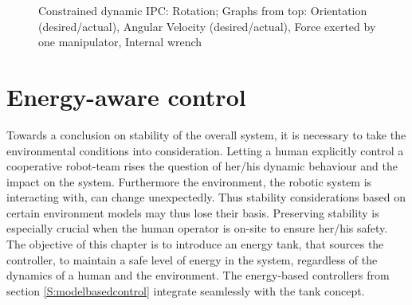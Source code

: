 \documentclass[a4paper,twoside, openright,12pt]{report}
\begin{document}
\begin{figure}[t]
\begin{tikzpicture}
\end{tikzpicture}
\vspace{-10pt}
\caption[IPC: Rotation]{Constrained dynamic IPC: Rotation; Graphs from top: Orientation (desired/actual), Angular Velocity (desired/actual), Force exerted by one manipulator, Internal wrench}
	\label{FIG:DIPCrot}
\end{figure}


\chapter{Energy-aware control}\label{C:Energy-aware control}
Towards a conclusion on stability of the overall system, it is necessary to take the environmental conditions into consideration. Letting a human explicitly control a cooperative robot-team rises the question of her/his dynamic behaviour and the impact on the system. Furthermore the environment, the robotic system is interacting with, can change unexpectedly. Thus stability considerations based on certain environment models may thus lose their basis. Preserving stability is especially crucial when the human operator is on-site to ensure her/his safety. The objective of this chapter is to introduce an energy tank, that sources the controller, to maintain a safe level of energy in the system, regardless of the dynamics of a human and the environment. The energy-based controllers from section \ref{S:modelbasedcontrol} integrate seamlessly with the tank concept.
\end{document}
